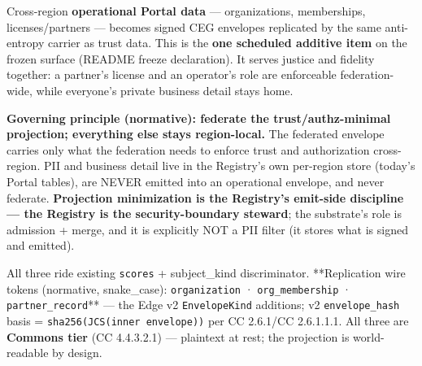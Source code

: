 \documentclass[11pt]{article}
\begin{document}
Cross-region \textbf{operational Portal data} — organizations, memberships, licenses/partners — becomes signed CEG envelopes replicated by the same anti-entropy carrier as trust data. This is the \textbf{one scheduled additive item} on the frozen surface (README freeze declaration). It serves justice and fidelity together: a partner's license and an operator's role are enforceable federation-wide, while everyone's private business detail stays home.


\textbf{Governing principle (normative): federate the trust/authz-minimal projection; everything else stays region-local.} The federated envelope carries only what the federation needs to enforce trust and authorization cross-region. PII and business detail live in the Registry's own per-region store (today's Portal tables), are NEVER emitted into an operational envelope, and never federate. \textbf{Projection minimization is the Registry's emit-side discipline — the Registry is the security-boundary steward}; the substrate's role is admission + merge, and it is explicitly NOT a PII filter (it stores what is signed and emitted).


All three ride existing \texttt{scores} + subject\_kind discriminator. **Replication wire tokens (normative, snake\_case): \texttt{organization} · \texttt{org\_membership} · \texttt{partner\_record}** — the Edge v2 \texttt{EnvelopeKind} additions; v2 \texttt{envelope\_hash} basis = \texttt{sha256(JCS(inner envelope))} per CC 2.6.1/CC 2.6.1.1.1. All three are \textbf{Commons tier} (CC 4.4.3.2.1) — plaintext at rest; the projection is world-readable by design.
\end{document}
